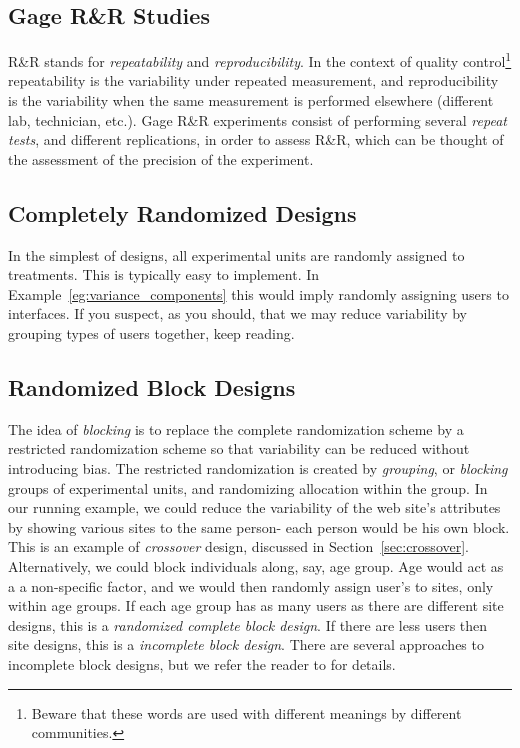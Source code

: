 \documentclass[12pt,a4paper]{report}
\theoremstyle{plain}
\theoremstyle{definition}
\begin{document}
\subsection{Gage R\&R Studies}
R\&R stands for \emph{repeatability} and \emph{reproducibility}.
In the context of quality control\footnote{Beware that these words are used with different meanings by different communities.} repeatability is the variability under repeated measurement, and reproducibility is the variability when the same measurement is performed elsewhere (different lab, technician, etc.).
Gage R\&R experiments consist of performing several \emph{repeat tests}, and different replications, in order to assess R\&R, which can be thought of the assessment of the precision of the experiment. 



\subsection{Completely Randomized Designs}
In the simplest of designs, all experimental units are randomly assigned to treatments. 
This is typically easy to implement.
In Example~\ref{eg:variance_components} this would imply randomly assigning users to interfaces.
If you suspect, as you should, that we may reduce variability by grouping types of users together, keep reading.



\subsection{Randomized Block Designs}
The idea of \emph{blocking} is to replace the complete randomization scheme by a restricted randomization scheme so that variability can be reduced without introducing bias. 
The restricted randomization is created by \emph{grouping}, or \emph{blocking} groups of experimental units, and randomizing allocation within the group. 
In our running example, we could reduce the variability of the web site's attributes by showing various sites to the same person- each person would be his own block. This is an example of \emph{crossover} design, discussed in Section~\ref{sec:crossover}.
Alternatively, we could block individuals along, say, age group. Age would act as a a non-specific factor, and we would then randomly assign user's to sites, only within age groups.
If each age group has as many users as there are different site designs, this is a \emph{randomized complete block design}.
If there are less users then site designs, this is a \emph{incomplete block design}.
There are several approaches to incomplete block designs, but we refer the reader to \cite[Sec.4.2]{cox_theory_2000} for details.
\end{document}
